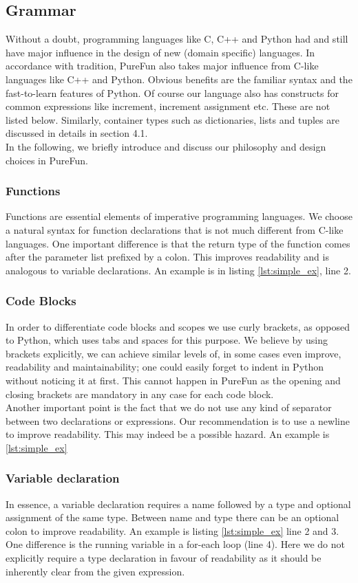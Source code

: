 \subsection{Grammar}
Without a doubt, programming languages like C, C++ and Python had and still have major influence in the design of new (domain specific) languages. In accordance with tradition, PureFun also takes major influence from C-like languages like C++ and Python. Obvious benefits are the familiar syntax and the fast-to-learn features of Python. Of course our language also has constructs for common expressions like increment, increment assignment etc. These are not listed below. Similarly, container types such as dictionaries, lists and tuples are discussed in details in section 4.1.\\
In the following, we briefly introduce and discuss our philosophy and design choices in PureFun.
\subsubsection{Functions} Functions are essential elements of imperative programming languages. We choose a natural syntax for function declarations that is not much different from C-like languages. One important difference is that the return type of the function comes after the parameter list prefixed by a colon. This improves readability and is analogous to variable declarations. An example is in listing \ref{lst:simple_ex}, line 2.
\subsubsection{Code Blocks} In order to differentiate code blocks and scopes we use curly brackets, as opposed to Python, which uses tabs and spaces for this purpose. We believe by using brackets explicitly, we can achieve similar levels of, in some cases even improve, readability and maintainability; one could easily forget to indent in Python without noticing it at first. This cannot happen in PureFun as the opening and closing brackets are mandatory in any case for each code block.\\
Another important point is the fact that we do not use any kind of separator between two declarations or expressions. Our recommendation is to use a newline to improve readability. This may indeed be a possible hazard. An example is \ref{lst:simple_ex}
\subsubsection{Variable declaration} In essence, a variable declaration requires a name followed by a type and optional assignment of the same type. Between name and type there can be an optional colon to improve readability. An example is listing \ref{lst:simple_ex} line 2 and 3.\\
One difference is the running variable in a for-each loop (line 4). Here we do not explicitly require a type declaration in favour of readability as it should be inherently clear from the given expression.

